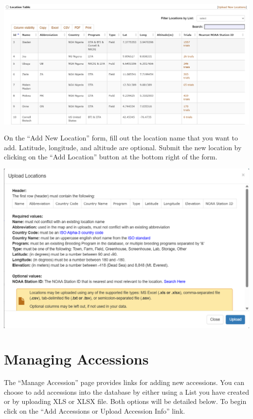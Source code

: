 \documentclass[
  12pt,
]{book}
\begin{document}
\begin{center}\includegraphics[width=0.95\linewidth]{assets/images/image141} \end{center}

On the ``Add New Location'' form, fill out the location name that you want to add. Latitude, longitude, and altitude are optional. Submit the new location by clicking on the ``Add Location'' button at the bottom right of the form.

\begin{center}\includegraphics[width=0.95\linewidth]{assets/images/image187} \end{center}

\hypertarget{managing-accessions}{%
\chapter{Managing Accessions}\label{managing-accessions}}

The ``Manage Accession'' page provides links for adding new accessions. You can choose to add accessions into the database by either using a List you have created or by uploading XLS or XLSX file. Both options will be detailed below. To begin click on the ``Add Accessions or Upload Accession Info'' link.
\end{document}
